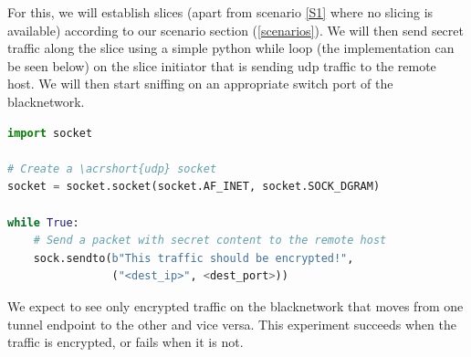 \begin{description}[style=multiline, labelwidth=0.7cm]
    For this, we will establish slices (apart from scenario \ref{S1} where no slicing is available) according to our scenario section (\ref{scenarios}). We will then send secret traffic along the slice using a simple python while loop (the implementation can be seen below) on the slice initiator that is sending \acrshort{udp} traffic to the remote host. We will then start sniffing on an appropriate switch port of the \gls{blacknetwork}.

    \begin{lstlisting}[language=python]
import socket

# Create a \acrshort{udp} socket
socket = socket.socket(socket.AF_INET, socket.SOCK_DGRAM)

while True:
    # Send a packet with secret content to the remote host
    sock.sendto(b"This traffic should be encrypted!",
                ("<dest_ip>", <dest_port>))
    \end{lstlisting}

    We expect to see only encrypted traffic on the \gls{blacknetwork} that moves from one tunnel endpoint to the other and vice versa. This experiment succeeds when the traffic is encrypted, or fails when it is not.






\end{description}

